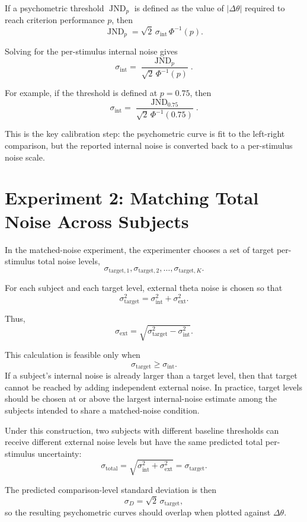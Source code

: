 \documentclass[11pt]{article}
\begin{document}
If a psychometric threshold $\operatorname{JND}_p$ is defined as the value of
$|\Delta\theta|$ required to reach criterion performance $p$, then
\[
\operatorname{JND}_p
= \sqrt{2}\,\sigma_{\mathrm{int}}\,\Phi^{-1}(p).
\]

Solving for the per-stimulus internal noise gives
\[
\sigma_{\mathrm{int}}
= \frac{\operatorname{JND}_p}
{\sqrt{2}\,\Phi^{-1}(p)}.
\]

For example, if the threshold is defined at $p=0.75$, then
\[
\sigma_{\mathrm{int}}
= \frac{\operatorname{JND}_{0.75}}
{\sqrt{2}\,\Phi^{-1}(0.75)}.
\]

This is the key calibration step: the psychometric curve is fit to the
left-right comparison, but the reported internal noise is converted back to a
per-stimulus noise scale.

\section{Experiment 2: Matching Total Noise Across Subjects}

In the matched-noise experiment, the experimenter chooses a set of target
per-stimulus total noise levels,
\[
\sigma_{\mathrm{target},1},
\sigma_{\mathrm{target},2},
\dots,
\sigma_{\mathrm{target},K}.
\]

For each subject and each target level, external theta noise is chosen so that
\[
\sigma_{\mathrm{target}}^2
= \sigma_{\mathrm{int}}^2 + \sigma_{\mathrm{ext}}^2.
\]

Thus,
\[
\sigma_{\mathrm{ext}}
= \sqrt{
\sigma_{\mathrm{target}}^2 - \sigma_{\mathrm{int}}^2
}.
\]

This calculation is feasible only when
\[
\sigma_{\mathrm{target}} \ge \sigma_{\mathrm{int}}.
\]
If a subject's internal noise is already larger than a target level, then that
target cannot be reached by adding independent external noise. In practice,
target levels should be chosen at or above the largest internal-noise estimate
among the subjects intended to share a matched-noise condition.

Under this construction, two subjects with different baseline thresholds can
receive different external noise levels but have the same predicted total
per-stimulus uncertainty:
\[
\sigma_{\mathrm{total}}
= \sqrt{\sigma_{\mathrm{int}}^2 + \sigma_{\mathrm{ext}}^2}
= \sigma_{\mathrm{target}}.
\]

The predicted comparison-level standard deviation is then
\[
\sigma_D = \sqrt{2}\,\sigma_{\mathrm{target}},
\]
so the resulting psychometric curves should overlap when plotted against
$\Delta\theta$.
\end{document}
